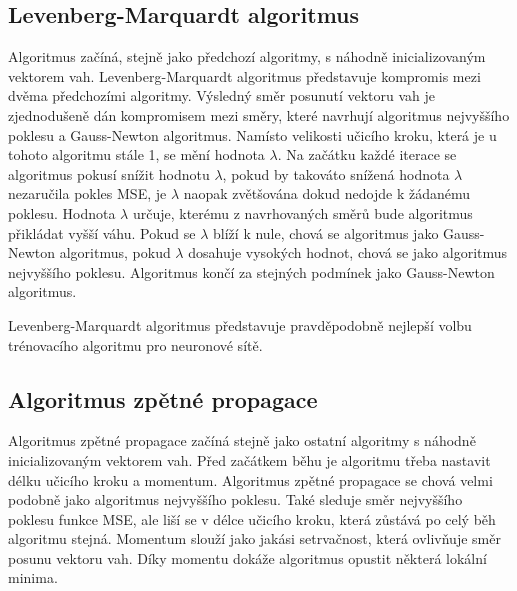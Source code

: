 \documentclass[11pt,twoside,a4paper]{book}
\begin{document}
\subsection{Levenberg-Marquardt algoritmus}
Algoritmus začíná, stejně jako předchozí algoritmy, s náhodně inicializovaným vektorem vah. Levenberg-Marquardt algoritmus představuje kompromis mezi dvěma předchozími algoritmy. Výsledný směr posunutí vektoru vah je zjednodušeně dán kompromisem mezi směry, které navrhují algoritmus nejvyššího poklesu a Gauss-Newton algoritmus.  Namísto velikosti učicího kroku, která je u tohoto algoritmu stále 1, se mění hodnota \begin{math}\lambda\end{math}. Na začátku každé iterace se algoritmus pokusí snížit hodnotu \begin{math}\lambda\end{math}, pokud by takováto snížená hodnota \begin{math}\lambda\end{math} nezaručila pokles MSE, je \begin{math}\lambda\end{math} naopak zvětšována dokud nedojde k žádanému poklesu. Hodnota \begin{math}\lambda\end{math} určuje, kterému z navrhovaných směrů bude algoritmus přikládat vyšší váhu. Pokud se \begin{math}\lambda\end{math} blíží k nule, chová se algoritmus jako Gauss-Newton algoritmus, pokud \begin{math}\lambda\end{math} dosahuje vysokých hodnot, chová se jako algoritmus nejvyššího poklesu. Algoritmus končí za stejných podmínek jako Gauss-Newton algoritmus.\cite{nndocumentation}\cite{learningmachines} 

Levenberg-Marquardt algoritmus představuje pravděpodobně nejlepší volbu trénovacího algoritmu pro neuronové sítě.

\subsection{Algoritmus zpětné propagace}
Algoritmus zpětné propagace začíná stejně jako ostatní algoritmy s náhodně inicializovaným vektorem vah. Před začátkem běhu je algoritmu třeba nastavit délku učicího kroku a momentum. Algoritmus zpětné propagace se chová velmi podobně jako algoritmus nejvyššího poklesu. Také sleduje směr nejvyššího poklesu funkce MSE, ale liší se v délce učicího kroku, která zůstává po celý běh algoritmu stejná. Momentum slouží jako jakási setrvačnost, která ovlivňuje směr posunu vektoru vah. Díky momentu dokáže algoritmus opustit některá lokální minima. 
\end{document}
